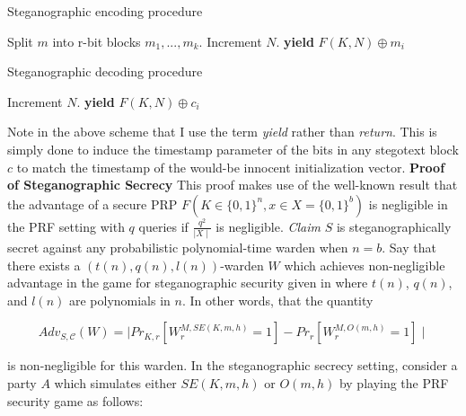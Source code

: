 \documentclass{article}
\begin{document}
\begin{algorithm}[H]
\caption{Steganographic encoding procedure}\label{1a}
\begin{algorithmic}[1]
\State Split $m$ into r-bit blocks $m_1,...,m_k$.
\State Increment $N$.
\State \textbf{yield} $F(K,N) \oplus m_i$
\EndFor
\EndProcedure
\end{algorithmic}
\end{algorithm}

\begin{algorithm}[H]
\caption{Steganographic decoding procedure}\label{1a}
\begin{algorithmic}[1]
	\State Increment $N$.
	\State \textbf{yield} $F(K,N) \oplus c_i$ 
\EndFor
\EndProcedure
\end{algorithmic}
\end{algorithm}

Note in the above scheme that I use the term \textit{yield} rather than \textit{return}.  This is simply done to induce the timestamp parameter 
of the bits in any stegotext block $c$ to match the timestamp of the would-be innocent initialization vector.
\newline\newline
\noindent \textbf{Proof of Steganographic Secrecy } This proof makes use of the well-known result that the advantage of a 
secure PRP $F(K \in \{0,1\}^n, x \in X = \{0,1\}^b)$ is negligible in the PRF setting with $q$ queries if $\frac{q^2}{\mid X \mid}$
is negligible.
\newline\newline
\noindent \textit{Claim } $S$ is steganographically secret against any probabilistic polynomial-time warden when $n=b$.
\newline\newline
Say that there exists a $(t(n), q(n), l(n))$-warden $W$ which achieves non-negligible advantage in the game for 
steganographic security given in \cite{BiglouPSS} where $t(n)$, $q(n)$, and $l(n)$ are polynomials in $n$.  In other words, that the quantity 

\[ Adv_{S,\mathcal{C}}(W) = \mid Pr_{K,r}[W_r^{M,SE(K,m,h)} = 1] - Pr_{r}[W_r^{M,O(m,h)} = 1] \mid \]

is non-negligible for this warden.  In the steganographic secrecy setting, consider a party $A$ which simulates either $SE(K,m,h)$ or $O(m,h)$ 
by playing the PRF security game as follows:
\end{document}
